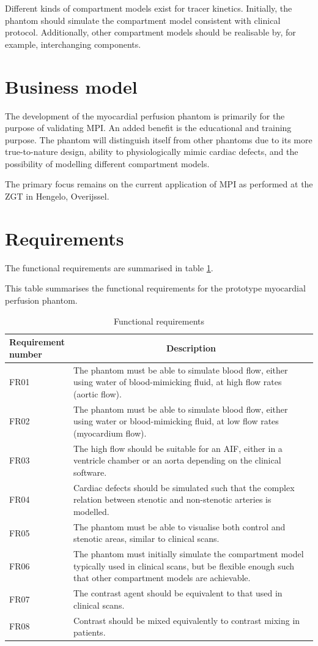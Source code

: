Different kinds of compartment models exist for tracer kinetics. Initially, the phantom should simulate the compartment model consistent with clinical protocol. Additionally, other compartment models should be realisable by, for example, interchanging components.

\section{Business model}
The development of the myocardial perfusion phantom is primarily for the purpose of validating \ac{MPI}. An added benefit is the educational and training purpose. The phantom will distinguish itself from other phantoms due to its more true-to-nature design, ability to physiologically mimic cardiac defects, and the possibility of modelling different compartment models.

The primary focus remains on the current application of \ac{MPI} as performed at the ZGT in Hengelo, Overijssel.

\section{Requirements}
The functional requirements are summarised in table \ref{tab:funcreq}.

\begin{table}
\caption{Functional requirements}
\label{tab:funcreq}
This table summarises the functional requirements for the prototype myocardial perfusion phantom.
\begin{tabular}{l|p{120mm}|}
	\makecell[l]{Requirement \\ number} & \multicolumn{1}{c}{Description}\\
	\hline
	FR01 & The phantom must be able to simulate blood flow, either using water of blood-mimicking fluid, at high flow rates (aortic flow). \\ 
	\rowcolor{Gray}
	FR02 & The phantom must be able to simulate blood flow, either using water or blood-mimicking fluid, at low flow rates (myocardium flow). \\
	FR03 & The high flow should be suitable for an \ac{AIF}, either in a ventricle chamber or an aorta depending on the clinical software. \\
	\rowcolor{Gray}
	FR04 & Cardiac defects should be simulated such that the complex relation between stenotic and non-stenotic arteries is modelled. \\
	FR05 & The phantom must be able to visualise both control and stenotic areas, similar to clinical scans. \\
	\rowcolor{Gray}
	FR06 & The phantom must initially simulate the compartment model typically used in clinical scans, but be flexible enough such that other compartment models are achievable. \\
	FR07 & The contrast agent should be equivalent to that used in clinical scans. \\
	\rowcolor{Gray}
	FR08 & Contrast should be mixed equivalently to contrast mixing in patients. \\
	\cline{2-2}
\end{tabular}
\end{table}

